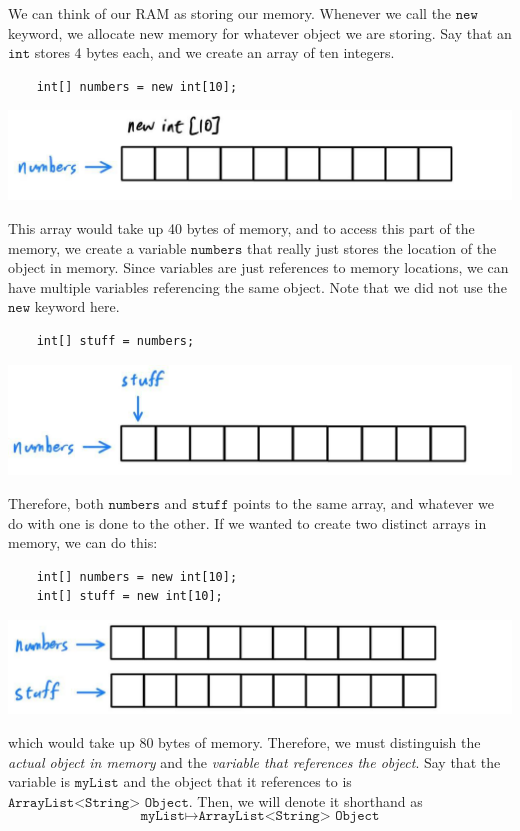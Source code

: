 \documentclass{article}
\begin{document}
    We can think of our RAM as storing our memory. Whenever we call the  $\texttt{new}$ keyword, we allocate new memory for whatever object we are storing. Say that an $\texttt{int}$ stores $4$ bytes each, and we create an array of ten integers. 
    \begin{lstlisting}
    int[] numbers = new int[10]; 
    \end{lstlisting}
    \begin{center}
      \includegraphics[scale=0.3]{img/reference1.jpg}
    \end{center}
    This array would take up 40 bytes of memory, and to access this part of the memory, we create a variable $\texttt{numbers}$ that really just stores the location of the object in memory. Since variables are just references to memory locations, we can have multiple variables referencing the same object. Note that we did not use the $\texttt{new}$ keyword here. 
    \begin{lstlisting}
    int[] stuff = numbers; 
    \end{lstlisting}
    \begin{center}
      \includegraphics[scale=0.3]{img/reference2.jpg}
    \end{center}
    Therefore, both $\texttt{numbers}$ and $\texttt{stuff}$ points to the same array, and whatever we do with one is done to the other. If we wanted to create two distinct arrays in memory, we can do this: 
    \begin{lstlisting}
    int[] numbers = new int[10]; 
    int[] stuff = new int[10]; 
    \end{lstlisting}
    \begin{center}
      \includegraphics[scale=0.3]{img/reference3.jpg}
    \end{center}
    which would take up 80 bytes of memory. Therefore, we must distinguish the \textit{actual object in memory} and the \textit{variable that references the object}. Say that the variable is $\texttt{myList}$ and the object that it references to is $\texttt{ArrayList<String> Object}$. Then, we will denote it shorthand as 
    \[\texttt{myList} \mapsto \texttt{ArrayList<String> Object}\]
\end{document}
